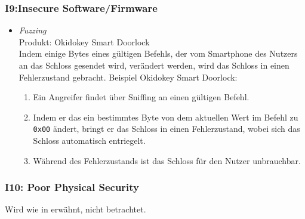     \subsubsection*{I9:Insecure Software/Firmware}
        \begin{itemize}[leftmargin=0cm,label={}]
            \item \emph{Fuzzing}\cite{Rose2016}\label{vuln:fuzzing}\\
                Produkt: Okidokey Smart Doorlock\\
                Indem einige Bytes eines gültigen Befehls, der vom Smartphone des Nutzers an das Schloss gesendet wird, verändert werden, wird das Schloss in einen Fehlerzustand gebracht. 
    	        Beispiel Okidokey Smart Doorlock:
    	        \begin{enumerate}[noitemsep]
    	            \item Ein Angreifer findet über Sniffing an einen gültigen Befehl.
    	            \item Indem er das ein bestimmtes Byte von dem aktuellen Wert im Befehl zu \colorbox{light-gray}{\lstinline{0x00}} ändert, bringt er das Schloss in einen Fehlerzustand, wobei sich das Schloss automatisch entriegelt.
    	            \item Während des Fehlerzustands ist das Schloss für den Nutzer unbrauchbar.
    	        \end{enumerate} 
        \end{itemize}
        
    \subsubsection*{I10: Poor Physical Security}
        Wird wie in  erwähnt, nicht betrachtet.
    